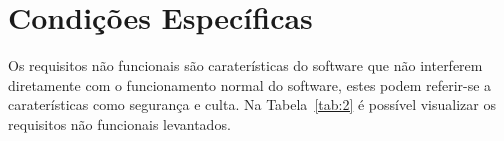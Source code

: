 \newpage
\section{Condições Específicas}

Os requisitos não funcionais são caraterísticas do software que não interferem diretamente com o 
funcionamento normal do software, estes podem referir-se a caraterísticas como segurança e culta. 
Na Tabela~\ref{tab:2} é possível visualizar os requisitos não funcionais levantados.

